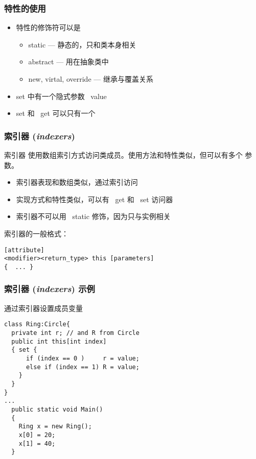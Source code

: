 \begin{frame}
\frametitle{特性的使用}
\begin{itemize}
\setlength{\itemsep}{8pt plus 1pt}
\item 特性的修饰符可以是
  \begin{itemize}
  \item static --- 静态的，只和类本身相关
  \item abstract --- 用在抽象类中
  \item new, virtal, override --- 继承与覆盖关系
  \end{itemize}
\item set 中有一个隐式参数 ~value
\item set 和 ~get 可以只有一个
\end{itemize}
\end{frame}


\begin{frame}[fragile]
\frametitle{索引器 (\textit{indexers})}

\begin{block}{索引器}
\CJKindent \small 使用数组索引方式访问类成员。使用方法和特性类似，但可以有多个
参数。
\end{block}
\begin{itemize}
\item 索引器表现和数组类似，通过索引访问
\item 实现方式和特性类似，可以有 ~get 和 ~set 访问器
\item 索引器不可以用 ~static 修饰，因为只与实例相关
\end{itemize}

索引器的一般格式：
\begin{lstlisting}
[attribute]
<modifier><return_type> this [parameters]
{  ... }
\end{lstlisting}

\end{frame}

\begin{frame}[fragile]
\frametitle{索引器 (\textit{indexers}) 示例}
通过索引器设置成员变量
\begin{lstlisting}
class Ring:Circle{
  private int r; // and R from Circle
  public int this[int index]
  { set {
      if (index == 0 )     r = value;
      else if (index == 1) R = value;
    }
  }
}
...
  public static void Main()
  {
    Ring x = new Ring();
    x[0] = 20;
    x[1] = 40;
  }
\end{lstlisting}
\end{frame}

